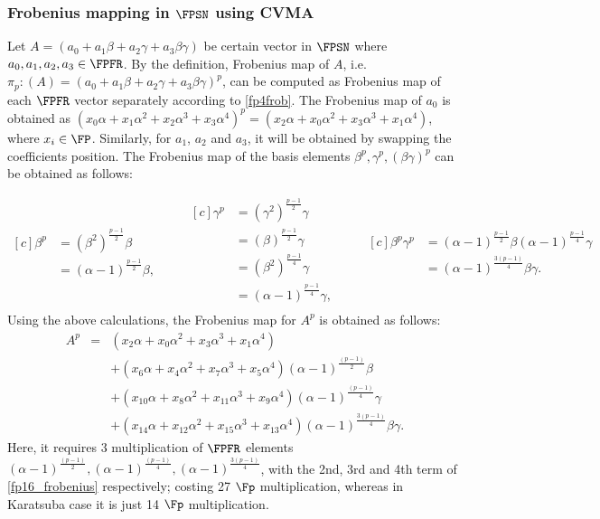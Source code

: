 \subsubsection{Frobenius mapping in $\FPSN$ using CVMA}\label{fobenius_map}
Let $A=(a_0+a_1\beta+a_2\gamma+a_3\beta \gamma)$ be certain vector in $\FPSN$ where $a_0,a_1,a_2, a_3 \in \FPFR$.
By the definition, Frobenius map of $A$, i.e. $\pi_p : (A) = (a_0+a_1\beta+a_2\gamma+a_3\beta \gamma)^p$, can be computed as Frobenius map of each $\FPFR$ vector separately according to \eqref{fp4frob}. 
The Frobenius map of $a_0$  is obtained as $(x_0\alpha+ x_1\alpha^2 + x_2\alpha^3 +x_3\alpha^4)^p = (x_2\alpha+ x_0\alpha^2 + x_3\alpha^3 +x_1\alpha^4)$, where $x_i \in \FP$.
Similarly, for $a_1$, $a_2$ and $a_3$, it  will be obtained by swapping the coefficients position.
The Frobenius map of the basis elements $\beta^p, \gamma^p, (\beta\gamma)^p$ can be obtained as follows:

\begin{equation*}
\begin{aligned}[c]
\beta^p&=(\beta^2)^{\frac{p-1}{2}}\beta \\
 &=(\alpha-1)^{\frac{p-1}{2}}\beta,
\end{aligned}
\qquad
\begin{aligned}[c]
\gamma^p&=(\gamma^2)^{\frac{p-1}{2}}\gamma \nonumber \\
&=(\beta)^{\frac{p-1}{2}}\gamma \nonumber \\
&=(\beta^2)^{\frac{p-1}{4}}\gamma \nonumber \\
&=(\alpha-1)^{\frac{p-1}{4}}\gamma, \nonumber \\
\end{aligned}
\qquad 
\begin{aligned}[c]
\beta^p \gamma^p &= (\alpha-1)^{\frac{p-1}{2}}\beta (\alpha-1)^{\frac{p-1}{4}}\gamma \nonumber \\
&=(\alpha-1)^{\frac{3(p-1)}{4}} \beta \gamma. \nonumber 
\end{aligned}
\end{equation*}
Using the above calculations, the Frobenius map for $A^p$ is obtained as follows:
\begin{eqnarray}\label{fp16_frobenius}
A^p &=&  ( x_2 \alpha+x_0 \alpha^2+ x_3 \alpha^3+x_1\alpha^4) \nonumber \\
&& + ( x_6 \alpha+x_4 \alpha^2+ x_7 \alpha^3+x_5\alpha^4)(\alpha-1)^{\frac{(p-1)}{2}}\beta \nonumber \\
& & +  ( x_{10} \alpha+x_8 \alpha^2+ x_{11} \alpha^3+x_9\alpha^4)(\alpha-1)^{\frac{(p-1)}{4}}\gamma \nonumber \\
&&+ ( x_{14} \alpha+x_{12} \alpha^2+ x_{15} \alpha^3+x_{13}\alpha^4)(\alpha-1)^{\frac{3(p-1)}{4}}\beta \gamma.
\end{eqnarray}
 Here, it requires 3 multiplication of $\FPFR$ elements $(\alpha-1)^{\frac{(p-1)}{2}}, (\alpha-1)^{\frac{(p-1)}{4}}, (\alpha-1)^{\frac{3(p-1)}{4}}$, with the 2nd, 3rd and 4th term of \eqref{fp16_frobenius} respectively; costing 27 $\Fp$ multiplication, whereas in Karatsuba case it is just 14 $\Fp$ multiplication.

